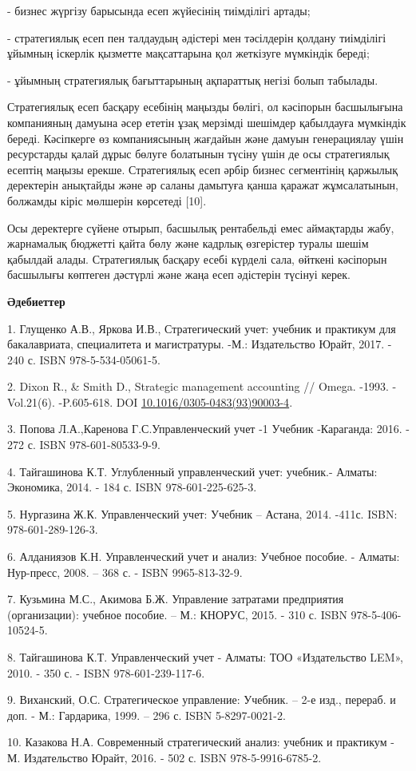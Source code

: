 \begin{multicols}{2}
- бизнес жүргізу барысында есеп жүйесінің тиімділігі артады;

- стратегиялық есеп пен талдаудың әдістері мен тәсілдерін қолдану
тиімділігі ұйымның іскерлік қызметте мақсаттарына қол жеткізуге
мүмкіндік береді;

- ұйымның стратегиялық бағыттарының ақпараттық негізі болып табылады.

Стратегиялық есеп басқару есебінің маңызды бөлігі, ол кәсіпорын
басшылығына компанияның дамуына әсер ететін ұзақ мерзімді шешімдер
қабылдауға мүмкіндік береді. Кәсіпкерге өз компаниясының жағдайын және
дамуын генерациялау үшін ресурстарды қалай дұрыс бөлуге болатынын түсіну
үшін де осы стратегиялық есептің маңызы ерекше. Стратегиялық есеп әрбір
бизнес сегментінің қаржылық деректерін анықтайды және әр саланы дамытуға
қанша қаражат жұмсалатынын, болжамды кіріс мөлшерін көрсетеді {[}10{]}.

Осы деректерге сүйене отырып, басшылық рентабельді емес аймақтарды жабу,
жарнамалық бюджетті қайта бөлу және кадрлық өзгерістер туралы шешім
қабылдай алады. Стратегиялық басқару есебі күрделі сала, өйткені
кәсіпорын басшылығы көптеген дәстүрлі және жаңа есеп әдістерін түсінуі
керек.
\end{multicols}

\begin{center}
{\bfseries Әдебиеттер}
\end{center}

\begin{references}
1. Глущенко А.В., Яркова И.В., Стратегический учет: учебник и практикум
для бакалавриата, специалитета и магистратуры. -М.: Издательство
Юрайт, 2017. - 240 с. ISBN 978-5-534-05061-5.

2. Dixon R., \& Smith D., Strategic management accounting // Omega.
-1993. -Vol.21(6). -P.605-618. DOI
\href{https://doi.org/10.1016/0305-0483(93)90003-4}{10.1016/0305-0483(93)90003-4}.

3. Попова Л.А.,Каренова Г.С.Управленческий учет -1 Учебник -Караганда:
2016. - 272 с. ISBN 978-601-80533-9-9.

4. Тайгашинова К.Т. Углубленный управленческий учет: учебник.- Алматы:
Экономика, 2014. - 184 с. ISBN 978-601-225-625-3.

5. Нургазина Ж.К. Управленческий учет: Учебник -- Астана, 2014. -411с.
ISBN: 978-601-289-126-3.

6. Алданиязов К.Н. Управленческий учет и анализ: Учебное пособие. -
Алматы: Нур-пресс, 2008. -- 368 с. - ISBN 9965-813-32-9.

7. Кузьмина М.С., Акимова Б.Ж. Управление затратами предприятия
(организации): учебное пособие. -- М.: КНОРУС, 2015. - 310 с. ISBN
978-5-406-10524-5.

8. Тайгашинова К.Т. Управленческий учет - Алматы: ТОО «Издательство LEM»,
2010. - 350 с. - ISBN 978-601-239-117-6.

9. Виханский, О.С. Стратегическое управление: Учебник. -- 2-е изд.,
перераб. и доп. - М.: Гардарика, 1999. -- 296 с. ISBN 5-8297-0021-2.

10. Казакова Н.А. Современный стратегический анализ: учебник и практикум -
М. Издательство Юрайт, 2016. - 502 с. ISBN 978-5-9916-6785-2.
\end{references}

